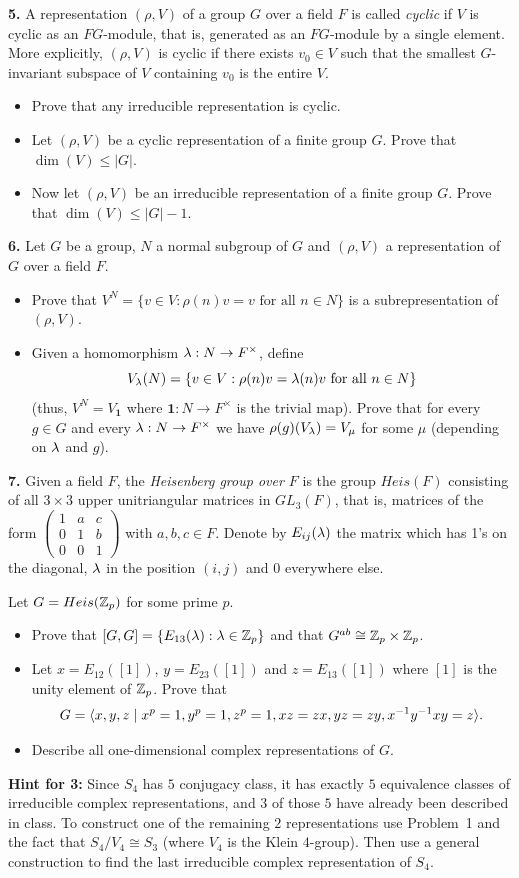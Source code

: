 \documentclass[11pt]{amsart}
\begin{document}
{\bf 5.} A representation $(\rho,V)$ of a group $G$ over a field $F$ is called {\it cyclic} if $V$ is cyclic as an $FG$-module,
that is, generated as an $FG$-module by a single element. More explicitly, $(\rho,V)$ is cyclic if there exists $v_0\in V$
such that the smallest $G$-invariant subspace of $V$ containing $v_0$ is the entire $V$.
\begin{itemize}
\item[(a)] Prove that any irreducible representation is cyclic.
\item[(b)] Let  $(\rho,V)$ be a cyclic representation of a finite group $G$. Prove that $\dim(V)\leq |G|$.
\item[(c)] Now let  $(\rho,V)$ be an irreducible representation of a finite group $G$. Prove that $\dim(V)\leq |G|-1$.
\end{itemize}
\skv
{\bf 6.} Let $G$ be a group, $N$ a normal subgroup of $G$ and $(\rho,V)$ a representation of $G$ over a field $F$.
\begin{itemize}
\item[(a)] Prove that $V^N=\{v\in V: \rho(n)v=v\mbox{ for all }n\in N\}$ is a subrepresentation of $(\rho,V)$.
\item[(b)] Given a homomorphism
 ${\lambda}:N\to F^{\times}$, define $$V_{{\lambda}}(N)=\{v\in V: \rho(n)v={\lambda}(n)v\mbox{ for all }n\in N\}$$
(thus, $V^N=V_{\mathbf 1}$ where $\mathbf 1:N\to F^{\times}$ is the trivial map). Prove that for every $g\in G$
and every ${\lambda}:N\to F^{\times}$ we have $\rho(g)(V_{{\lambda}})=V_{\mu}$ for some $\mu$ (depending on ${\lambda}$ and $g$).
\end{itemize}
\skv
{\bf 7.} Given a field $F$, the \emph{Heisenberg group over $F$} is the group $Heis(F)$ consisting of all $3\times 3$ upper unitriangular matrices in $GL_3(F)$, that is, matrices of the form $\begin{pmatrix}1&a&c\\ 0& 1& b\\ 0&0&1\end{pmatrix}$
with $a,b,c\in F$. Denote by $E_{ij}({\lambda})$ the matrix which has 1's on the diagonal, ${\lambda}$ in the position $(i,j)$ and $0$
everywhere else.

Let $G=Heis({\mathbb Z}_p)$ for some prime $p$.
\begin{itemize}
\item[(a)] Prove that $[G,G]=\{E_{13}({\lambda}):{\lambda}\in {\mathbb Z}_p\}$ and that 
$G^{ab}\cong {\mathbb Z}_p\times {\mathbb Z}_p$.
\item[(b)] Let $x=E_{12}([1])$, $y=E_{23}([1])$ and $z=E_{13}([1])$ where $[1]$ is the unity element of ${\mathbb Z}_p$. Prove that $$G={\langle} x,y,z \mid x^p=1, y^p=1, z^p=1, xz=zx, yz=zy, x^{-1}y^{-1}xy=z{\rangle}.$$
\item[(c)] Describe all one-dimensional complex representations of $G$.  
\end{itemize}
\newpage
{\bf Hint for 3:} Since $S_4$ has $5$ conjugacy class, it has exactly $5$ equivalence classes of irreducible complex representations,
and $3$ of those $5$ have already been described in class. To construct one of the remaining $2$ representations
use Problem~1 and the fact that $S_4/V_4\cong S_3$ (where $V_4$ is the Klein $4$-group). Then use a general construction  to 
find the last irreducible complex representation of $S_4$.
\end{document}

